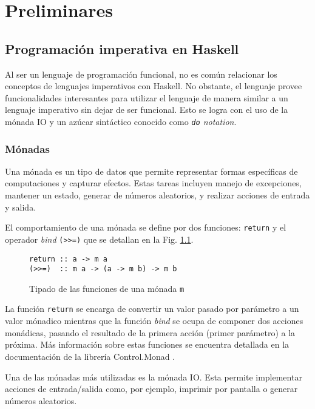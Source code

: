 \chapter{Preliminares}\label{chap:prelims}

\section{Programación imperativa en Haskell}

Al ser un lenguaje de programación funcional, no es común relacionar los conceptos de lenguajes imperativos con Haskell. No obstante, el lenguaje provee funcionalidades interesantes para utilizar el lenguaje de manera similar a un lenguaje imperativo sin dejar de ser funcional.
Esto se logra con el uso de la mónada IO y un azúcar sintáctico conocido como \emph{\texttt{do} notation}.

\subsection{Mónadas}
Una mónada es un tipo de datos que permite representar formas específicas de computaciones y capturar efectos. Estas tareas incluyen manejo de excepciones, mantener un estado, generar de números aleatorios, y realizar acciones de entrada y salida.

El comportamiento de una mónada se define por dos funciones: \texttt{return} y el operador \emph{bind} \texttt{(>>=)} que se detallan en la Fig. \ref{fig:io-functions}.

\begin{figure}[!h]
  \centering
\begin{verbatim}
return :: a -> m a
(>>=)  :: m a -> (a -> m b) -> m b
\end{verbatim}
  \caption{Tipado de las funciones de una mónada \texttt{m}}
  \label{fig:io-functions}
\end{figure}

La función \texttt{return} se encarga de convertir un valor pasado por parámetro a un valor mónadico mientras que la función \emph{bind} se ocupa de componer dos acciones monádicas, pasando el resultado de la primera acción (primer parámetro) a la próxima. Más información sobre estas funciones se encuentra detallada en la documentación de la librería Control.Monad \cite{control-monad}.

Una de las mónadas más utilizadas es la mónada IO. Esta permite implementar acciones de entrada/salida como, por ejemplo, imprimir por pantalla o generar números aleatorios.



